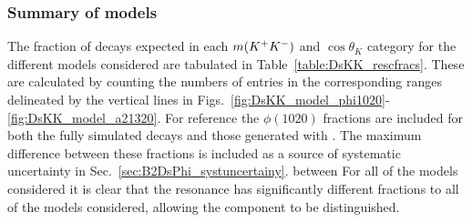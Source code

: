 


\subsubsection{Summary of models}

The fraction of decays expected in each $m({{K}^+}{{K}^-})$ and $\cos\theta_{K}$ category for the different models considered are tabulated in Table~\ref{table:DsKK_rescfracs}. These are calculated by counting the numbers of entries in the corresponding ranges delineated by the vertical lines in Figs.~\ref{fig:DsKK_model_phi1020}-\ref{fig:DsKK_model_a21320}. For reference the $\phi(1020)$ fractions are included for both the fully simulated decays and those generated with \laurapp. The maximum difference between these fractions is included as a source of systematic uncertainty in Sec.~\ref{sec:B2DsPhi_systuncertainy}.
between For all of the models considered it is clear that the \phiz resonance has significantly different fractions to all of the models considered, allowing the component to be distinguished.   


